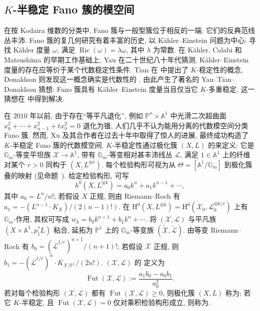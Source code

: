 \subsection{\texorpdfstring{$K$-半稳定 Fano 簇的模空间}{K-半稳定 Fano 簇的模空间}}\label{src:10.1.4-subsection}
在按 Kodaira 维数的分类中, Fano 簇与一般型簇位于相反的一端: 它们的反典范线丛丰沛. Fano 簇的复几何研究有着丰富的历史, 以 K\"ahler--Einstein 问题为中心: 寻找 K\"ahler 度量 $\omega$, 满足 $\operatorname{Ric}(\omega)=\lambda\omega$, 其中 $\lambda$ 为常数. 在 K\"ahler, Calabi 和 Matsushima 的早期工作基础上, Yau 在二十世纪八十年代猜测, K\"ahler--Einstein 度量的存在应等价于某个代数稳定性条件. Tian 在 \cite{Tia97} 中提出了 $K$-稳定性的概念, Donaldson 则发现这一概念确实是代数性的 \cite{Don02}. 由此产生了著名的 Yau--Tian--Donaldson 猜想: Fano 簇具有 K\"ahler--Einstein 度量当且仅当它 $K$-多重稳定. 这一猜想在 \cite{CDS15a,CDS15b,CDS15c,Szé16} 中得到解决.

在 $2010$ 年以前, 由于存在``等平凡退化'', 例如 $\mathbb P^n\times\mathbb A^1$ 中光滑二次超曲面 $x_0^2+\cdots+x_{n-1}^2+tx_n^2=0$ 退化为锥, 人们几乎不认为能用分离的代数模空间分类 Fano 簇. 然而, Xu 及其合作者在过去十年中取得了惊人的进展, 最终成功构造了 $K$-半稳定 Fano 簇的代数模空间. $K$-半稳定性通过极化簇 $(X,L)$ 的来定义: 它是 $\mathbb G_m$-等变平坦族 $\mathcal X\to\mathbb A^1$, 带有 $\mathbb G_m$-等变相对甚丰沛线丛 $\mathcal L$, 满足 $1\in\mathbb A^1$ 上的纤维对某个 $r>0$ 同构于 $(X,L^{\otimes r})$. 每个检验构形可视为从 $\Theta=[\mathbb A^1/\mathbb G_m]$ 到极化簇叠的映射 (见命题~). 给定检验构形, 可写
\[
h^0(X,L^{\otimes k})=a_0k^n+a_1k^{n-1}+\cdots,
\]
其中 $a_0=L^n/n!$; 若假设 $X$ 正规, 则由 Riemann--Roch 有 $a_1=-(L^{n-1}\cdot K_X)/(2(n-1)!)$. 在 $\mathrm H^0(X,L^{\otimes k})=\mathrm H^0(\mathcal X_0,\mathcal L_0^{\otimes k/r})$ 上有 $\mathbb G_m$-作用, 其权可写成 $w_k=b_0k^{n+1}+b_1k^n+\cdots$. 将 $(\mathcal X,\mathcal L)$ 与平凡族 $(X\times\mathbb A^1,p_1^*L)$ 粘合, 延拓为 $\mathbb P^1$ 上的 $\mathbb G_m$-等变族 $(\widetilde{\mathcal X},\widetilde{\mathcal L})$. 由等变 Riemann--Roch 有 $b_0=(\overline{\mathcal L}^{1/r})^{n+1}/(n+1)!$; 若假设 $\mathcal X$ 正规, 则 $b_1=-(\overline{\mathcal L}^{1/r})^n\cdot K_{\overline{\mathcal X}/\mathbb P^1}/(2n!)$. $(\mathcal X,\mathcal L)$ 的 定义为
\[
\operatorname{Fut}(\mathcal X,\mathcal L):=\frac{a_1b_0-a_0b_1}{a_0^2}.
\]
若对每个检验构形 $(\mathcal X,\mathcal L)$ 都有 $\operatorname{Fut}(\mathcal X,\mathcal L)\geq0$, 则极化簇 $(X,L)$ 称为; 若它 $K$-半稳定, 且 $\operatorname{Fut}(\mathcal X,\mathcal L)=0$ 仅对乘积检验构形成立, 则称为.

